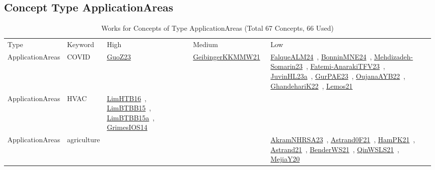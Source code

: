 \clearpage
\subsection{Concept Type ApplicationAreas}
\label{sec:ApplicationAreas}
\label{ApplicationAreas}
{\scriptsize
\begin{longtable}{lp{3cm}>{\raggedright\arraybackslash}p{6cm}>{\raggedright\arraybackslash}p{6cm}>{\raggedright\arraybackslash}p{8cm}}
\rowcolor{white}\caption{Works for Concepts of Type ApplicationAreas (Total 67 Concepts, 66 Used)}\\ \toprule
\rowcolor{white}Type & Keyword & High & Medium & Low\\ \midrule\endhead
\bottomrule
\endfoot
\index{COVID}\index{ApplicationAreas!COVID}ApplicationAreas & COVID & \href{../works/GuoZ23.pdf}{GuoZ23}~\cite{GuoZ23} & \href{../works/GeibingerKKMMW21.pdf}{GeibingerKKMMW21}~\cite{GeibingerKKMMW21} & \href{../works/FalqueALM24.pdf}{FalqueALM24}~\cite{FalqueALM24}, \href{../works/BonninMNE24.pdf}{BonninMNE24}~\cite{BonninMNE24}, \href{../works/Mehdizadeh-Somarin23.pdf}{Mehdizadeh-Somarin23}~\cite{Mehdizadeh-Somarin23}, \href{../works/Fatemi-AnarakiTFV23.pdf}{Fatemi-AnarakiTFV23}~\cite{Fatemi-AnarakiTFV23}, \href{../works/JuvinHL23a.pdf}{JuvinHL23a}~\cite{JuvinHL23a}, \href{../works/GurPAE23.pdf}{GurPAE23}~\cite{GurPAE23}, \href{../works/OujanaAYB22.pdf}{OujanaAYB22}~\cite{OujanaAYB22}, \href{../works/GhandehariK22.pdf}{GhandehariK22}~\cite{GhandehariK22}, \href{../works/Lemos21.pdf}{Lemos21}~\cite{Lemos21}\\
\index{HVAC}\index{ApplicationAreas!HVAC}ApplicationAreas & HVAC & \href{../works/LimHTB16.pdf}{LimHTB16}~\cite{LimHTB16}, \href{../works/LimBTBB15.pdf}{LimBTBB15}~\cite{LimBTBB15}, \href{../works/LimBTBB15a.pdf}{LimBTBB15a}~\cite{LimBTBB15a}, \href{../works/GrimesIOS14.pdf}{GrimesIOS14}~\cite{GrimesIOS14} &  & \\
\index{agriculture}\index{ApplicationAreas!agriculture}ApplicationAreas & agriculture &  &  & \href{../works/AkramNHRSA23.pdf}{AkramNHRSA23}~\cite{AkramNHRSA23}, \href{../works/Astrand0F21.pdf}{Astrand0F21}~\cite{Astrand0F21}, \href{../works/HamPK21.pdf}{HamPK21}~\cite{HamPK21}, \href{../works/Astrand21.pdf}{Astrand21}~\cite{Astrand21}, \href{../works/BenderWS21.pdf}{BenderWS21}~\cite{BenderWS21}, \href{../works/QinWSLS21.pdf}{QinWSLS21}~\cite{QinWSLS21}, \href{../works/MejiaY20.pdf}{MejiaY20}~\cite{MejiaY20}\\

\end{longtable}}
